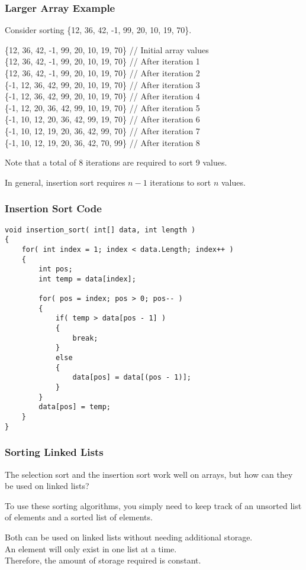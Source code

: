 \begin{frame}
\frametitle{Larger Array Example}

Consider sorting \{12, 36, 42, -1, 99, 20, 10, 19, 70\}.

	\{12, 36, 42, -1, 99, 20, 10, 19, 70\} 	// Initial array values\\
	\{\alert{12, 36}, 42, -1, 99, 20, 10, 19, 70\}	// After iteration 1\\
	\{\alert{12, 36, 42}, -1, 99, 20, 10, 19, 70\}	// After iteration 2\\
	\{\alert{-1, 12, 36, 42}, 99, 20, 10, 19, 70\}	// After iteration 3\\
	\{\alert{-1, 12, 36, 42, 99}, 20, 10, 19, 70\}	// After iteration 4\\
	\{\alert{-1, 12, 20, 36, 42, 99}, 10, 19, 70\}	// After iteration 5\\
	\{\alert{-1, 10, 12, 20, 36, 42, 99}, 19, 70\}	// After iteration 6\\
	\{\alert{-1, 10, 12, 19, 20, 36, 42, 99}, 70\}	// After iteration 7\\
 	\{\alert{-1, 10, 12, 19, 20, 36, 42, 70, 99}\}	// After iteration 8

Note that a total of 8 iterations are required to sort 9 values.

In general, insertion sort requires $n - 1$ iterations to sort $n$ values.

\end{frame}


\begin{frame}[fragile]
\frametitle{Insertion Sort Code}

{\scriptsize
\begin{verbatim}
void insertion_sort( int[] data, int length )
{
    for( int index = 1; index < data.Length; index++ )
    {
        int pos;
        int temp = data[index];

        for( pos = index; pos > 0; pos-- )
        {
            if( temp > data[pos - 1] )
            {
                break;
            }
            else
            {
                data[pos] = data[(pos - 1)];
            }
        }
        data[pos] = temp;
    }
}
\end{verbatim}
}
\end{frame}


\begin{frame}
\frametitle{Sorting Linked Lists}

The selection sort and the insertion sort work well on arrays, but how can they be used on linked lists?

To use these sorting algorithms, you simply need to keep track of an unsorted list of elements and a sorted list of elements.

Both can be used on linked lists without needing additional storage.\\
\quad An element will only exist in one list at a time.\\
\quad Therefore, the amount of storage required is constant.

\end{frame}


